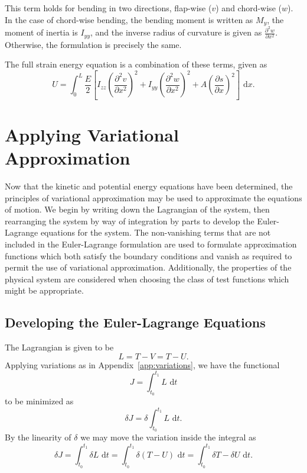 This term holds for bending in two directions, flap-wise ($v$) and chord-wise ($w$). In the case of chord-wise bending, the bending moment is written as $M_y$, the moment of inertia is $I_{yy}$, and the inverse radius of curvature is given as $\frac{\partial^2w}{\partial x^2}$. Otherwise, the formulation is precisely the same.

The full strain energy equation is a combination of these terms, given as
\begin{equation}
U = \int_0^L\frac{E}{2}\left[I_{zz}\left(\frac{\partial^2 v}{\partial x^2}\right)^2+I_{yy}\left(\frac{\partial^2 w}{\partial x^2}\right)^2+A\left(\frac{\partial s}{\partial x}\right)^2\right]\text{ d}x.
\label{eq:strain.final.chooyung}
\end{equation}

\section{Applying Variational Approximation}
Now that the kinetic and potential energy equations have been determined, the principles of variational approximation may be used to approximate the equations of motion. We begin by writing down the Lagrangian of the system, then rearranging the system by way of integration by parts to develop the Euler-Lagrange equations for the system. The non-vanishing terms that are not included in the Euler-Lagrange formulation are used to formulate approximation functions which both satisfy the boundary conditions and vanish as required to permit the use of variational approximation. Additionally, the properties of the physical system are considered when choosing the class of test functions which might be appropriate.

\subsection{Developing the Euler-Lagrange Equations}
The Lagrangian is given to be 
\begin{equation}
L = T-V = T-U.
\end{equation}
Applying variations as in Appendix~\ref{app:variations}, we have the functional 
\begin{equation}
J = \int_{t_0}^{t_1}L\text{ d}t
\end{equation}
to be minimized as
\begin{equation}
\delta J = \delta\int_{t_0}^{t_1}L\text{ d}t.
\end{equation}
By the linearity of $\delta$ we may move the variation inside the integral as
\begin{equation}
\delta J = \int_{t_0}^{t_1}\delta L\text{ d}t = \int_{t_0}^{t_1}\delta (T-U)\text{ d}t = \int_{t_0}^{t_1}\delta T - \delta U\text{ d}t.
\end{equation}

